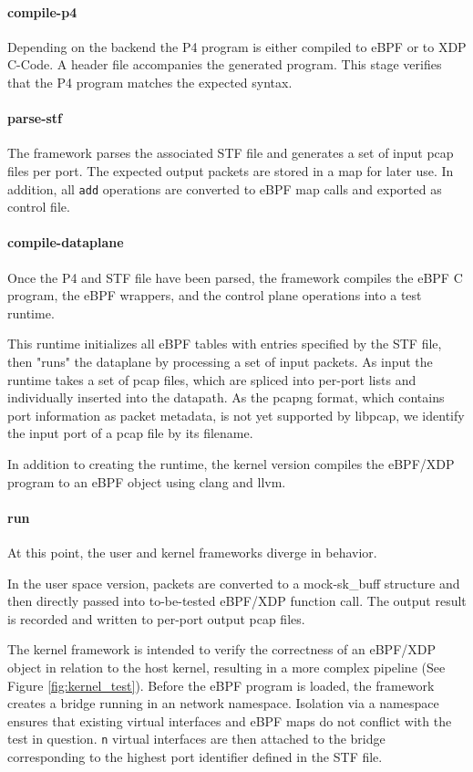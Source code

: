 \paragraph{compile-p4}
Depending on the backend the P4 program is either compiled to eBPF or 
to XDP C-Code. A header file accompanies the generated program. This stage 
verifies that the P4 program matches the expected syntax. 
\paragraph{parse-stf}
The framework parses the associated STF file and generates a set of input pcap 
files per port. The expected output packets are stored in a map for later use. 
In addition, all \texttt{add} operations are converted to eBPF map calls and 
exported as control file.
\paragraph{compile-dataplane}
Once the P4 and STF file have been parsed, the framework compiles 
the eBPF C program, the eBPF wrappers, and the control plane operations into a 
test runtime.

This runtime initializes all eBPF tables with entries specified by the STF 
file, then "runs" the dataplane by processing a set of input packets.
As input the runtime takes a set of pcap files, which are spliced into per-port 
lists and individually inserted into the datapath.
As the pcapng format, which contains port information as packet metadata, is 
not yet supported by libpcap, we identify the input port of a pcap file by
its filename.

In addition to creating the runtime, the kernel version compiles the eBPF/XDP 
program to an eBPF object using clang and llvm.
\paragraph{run}
At this point, the user and kernel frameworks diverge in behavior.

In the user space version, packets are converted to a mock-sk\_buff structure 
and then directly passed into to-be-tested eBPF/XDP function call. The output 
result is recorded and written to per-port output pcap files.

The kernel framework is intended to verify the correctness of an eBPF/XDP 
object in relation to the host kernel, resulting in a more complex pipeline 
(See Figure \ref{fig:kernel_test}). 
Before the eBPF program is loaded, the framework creates a bridge running in an 
network namespace. Isolation via a namespace ensures that existing 
virtual interfaces and eBPF maps do not conflict with the test in question.
\texttt{n} virtual interfaces are then attached to the bridge corresponding to 
the highest port identifier defined in the STF file.

